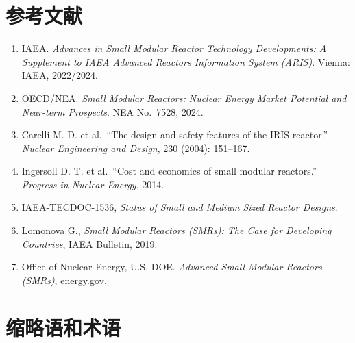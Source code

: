 \documentclass[
  UTF8,
  scheme=plain,
  fontsize=10pt,
  openany
]{ctexbook}
\begin{document}
\section{参考文献}\label{ux53c2ux8003ux6587ux732e}

\begin{enumerate}
\def\labelenumi{\arabic{enumi}.}
\tightlist
\item
  IAEA. \emph{Advances in Small Modular Reactor Technology Developments:
  A Supplement to IAEA Advanced Reactors Information System (ARIS)}.
  Vienna: IAEA, 2022/2024.
\item
  OECD/NEA. \emph{Small Modular Reactors: Nuclear Energy Market
  Potential and Near-term Prospects}. NEA No.~7528, 2024.
\item
  Carelli M. D. et al.~``The design and safety features of the IRIS
  reactor.'' \emph{Nuclear Engineering and Design}, 230 (2004):
  151--167.
\item
  Ingersoll D. T. et al.~``Cost and economics of small modular
  reactors.'' \emph{Progress in Nuclear Energy}, 2014.
\item
  IAEA-TECDOC-1536, \emph{Status of Small and Medium Sized Reactor
  Designs}.
\item
  Lomonova G., \emph{Small Modular Reactors (SMRs): The Case for
  Developing Countries}, IAEA Bulletin, 2019.
\item
  Office of Nuclear Energy, U.S. DOE. \emph{Advanced Small Modular
  Reactors (SMRs)}, energy.gov.
\end{enumerate}

\section{缩略语和术语}\label{ux7f29ux7565ux8bedux548cux672fux8bed}
\end{document}
